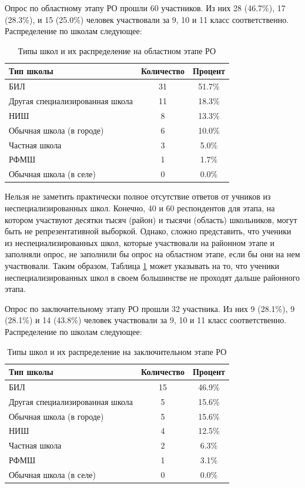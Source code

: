 Опрос по областному этапу РО прошли 60 участников. Из них 28 (46.7\%), 17 (28.3\%), и 15 (25.0\%) человек участвовали за 9, 10 и 11 класс соответственно. Распределение по школам следующее:

\begin{table}[ht]
    \centering
    \begin{tabular}{|l|c|c|}
        \hline
        \textbf{Тип школы} & \textbf{Количество} & \textbf{Процент} \\ \hline
        БИЛ & 31 & 51.7\% \\ \hline
        Другая специализированная школа & 11 & 18.3\% \\ \hline
        НИШ & 8 & 13.3\% \\ \hline
        Обычная школа (в городе) & 6 & 10.0\% \\ \hline
        Частная школа & 3 & 5.0\% \\ \hline
        РФМШ & 1 & 1.7\% \\ \hline
        Обычная школа (в селе) & 0 & 0.0\% \\ \hline
    \end{tabular}
    \caption{Типы школ и их распределение на областном этапе РО}
    \label{tab:obl-schools}
\end{table}

Нельзя не заметить практически полное отсутствие ответов от учников из неспециализированных школ. Конечно, 40 и 60 респондентов для этапа, на котором участвуют десятки тысяч (район) и тысячи (область) школьников, могут быть не репрезентативной выборкой. Однако, сложно представить, что ученики из неспециализированных школ, которые участвовали на районном этапе и заполняли опрос, не заполнили бы опрос на областном этапе, если бы они на нем участвовали. Таким образом, Таблица \ref{tab:obl-schools} может указывать на то, что ученики неспециализированных школ в своем большинстве не проходят дальше районного этапа.

Опрос по заключительному этапу РО прошли 32 участника. Из них 9 (28.1\%), 9 (28.1\%) и 14 (43.8\%) человек участвовали за 9, 10 и 11 класс соответственно. Распределение по школам следующее:

\begin{table}[ht]
    \centering
    \begin{tabular}{|l|c|c|}
    \hline
    \textbf{Тип школы} & \textbf{Количество} & \textbf{Процент} \\ \hline
    БИЛ & 15 & 46.9\% \\ \hline
    Другая специализированная школа & 5 & 15.6\% \\ \hline
    Обычная школа (в городе) & 5 & 15.6\% \\ \hline
    НИШ & 4 & 12.5\% \\ \hline
    Частная школа & 2 & 6.3\% \\ \hline
    РФМШ & 1 & 3.1\% \\ \hline
    Обычная школа (в селе) & 0 & 0.0\% \\ \hline
    \end{tabular}
    \caption{Типы школ и их распределение на заключительном этапе РО}
    \label{tab:respa-schools}
\end{table}

